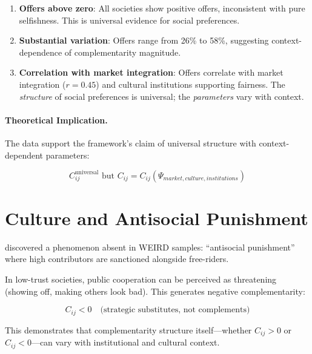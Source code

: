 \documentclass[12pt,oneside]{book}
\begin{document}
\begin{enumerate}
  \item \textbf{Offers above zero}: All societies show positive offers, inconsistent with pure
        selfishness. This is universal evidence for social preferences.

  \item \textbf{Substantial variation}: Offers range from 26\% to 58\%, suggesting context-dependence
        of complementarity magnitude.

  \item \textbf{Correlation with market integration}: Offers correlate with market integration
        ($r = 0.45$) and cultural institutions supporting fairness. The \emph{structure} of social
        preferences is universal; the \emph{parameters} vary with context.
\end{enumerate}

\paragraph{Theoretical Implication.}

The data support the framework's claim of universal structure with context-dependent parameters:

\begin{equation}
C_{ij}^{\text{universal}} \text{ but } C_{ij} = C_{ij}(\Psi_{market, culture, institutions})
\end{equation}

\section{Culture and Antisocial Punishment}

\citet{herrmannthoeni2008} discovered a phenomenon absent in WEIRD samples: ``antisocial punishment''
where high contributors are sanctioned alongside free-riders.

In low-trust societies, public cooperation can be perceived as threatening (showing off, making
others look bad). This generates negative complementarity:

\begin{equation}
C_{ij} < 0 \quad \text{(strategic substitutes, not complements)}
\end{equation}

This demonstrates that complementarity structure itself—whether $C_{ij} > 0$ or $C_{ij} < 0$—can
vary with institutional and cultural context.
\end{document}
